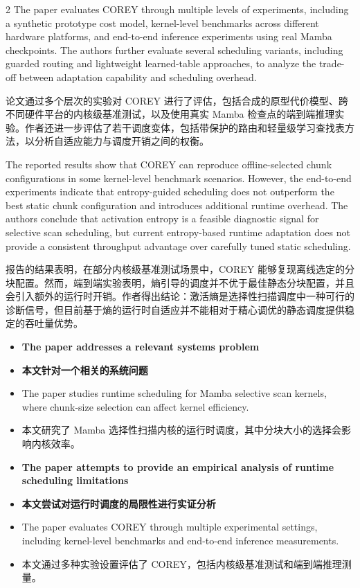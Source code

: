 \documentclass[10pt,a4paper]{article}
\newcommand{\Pair}[2]{#1\par\switchcolumn #2\par\switchcolumn*}
\newcommand{\fieldhead}[1]{{\color{accent}\sffamily\bfseries #1}}
\newcommand{\PairHead}[2]{\Pair{\needspace{5\baselineskip}\fieldhead{#1}}%
                               {\needspace{5\baselineskip}\fieldhead{#2}}}
\newcommand{\PItem}[3]{\Pair{\begin{itemize}[label={#1}]\item #2\end{itemize}}%
                            {\begin{itemize}[label={#1}]\item #3\end{itemize}}}
\newcommand{\PCont}[2]{\Pair{\begin{itemize}[label={}]\item #1\end{itemize}}%
                            {\begin{itemize}[label={}]\item #2\end{itemize}}}
\begin{document}
\begin{paracol}{2}
\Pair{The paper evaluates COREY through multiple levels of experiments, including a
synthetic prototype cost model, kernel-level benchmarks across different hardware
platforms, and end-to-end inference experiments using real Mamba checkpoints. The
authors further evaluate several scheduling variants, including guarded routing and
lightweight learned-table approaches, to analyze the trade-off between adaptation
capability and scheduling overhead.}
{论文通过多个层次的实验对 COREY 进行了评估，包括合成的原型代价模型、跨不同硬件平台的内核级基准测试，以及使用真实 Mamba 检查点的端到端推理实验。作者还进一步评估了若干调度变体，包括带保护的路由和轻量级学习查找表方法，以分析自适应能力与调度开销之间的权衡。}

\Pair{The reported results show that COREY can reproduce offline-selected chunk
configurations in some kernel-level benchmark scenarios. However, the end-to-end
experiments indicate that entropy-guided scheduling does not outperform the best
static chunk configuration and introduces additional runtime overhead. The authors
conclude that activation entropy is a feasible diagnostic signal for selective scan
scheduling, but current entropy-based runtime adaptation does not provide a
consistent throughput advantage over carefully tuned static scheduling.}
{报告的结果表明，在部分内核级基准测试场景中，COREY 能够复现离线选定的分块配置。然而，端到端实验表明，熵引导的调度并不优于最佳静态分块配置，并且会引入额外的运行时开销。作者得出结论：激活熵是选择性扫描调度中一种可行的诊断信号，但目前基于熵的运行时自适应并不能相对于精心调优的静态调度提供稳定的吞吐量优势。}

\PairHead{Strengths}{优点}

\PItem{1.}{\textbf{The paper addresses a relevant systems problem}}
{\textbf{本文针对一个相关的系统问题}}

\PCont{The paper studies runtime scheduling for Mamba selective scan kernels, where
chunk-size selection can affect kernel efficiency.}
{本文研究了 Mamba 选择性扫描内核的运行时调度，其中分块大小的选择会影响内核效率。}

\PItem{2.}{\textbf{The paper attempts to provide an empirical analysis of runtime
scheduling limitations}}
{\textbf{本文尝试对运行时调度的局限性进行实证分析}}

\PCont{The paper evaluates COREY through multiple experimental settings, including
kernel-level benchmarks and end-to-end inference measurements.}
{本文通过多种实验设置评估了 COREY，包括内核级基准测试和端到端推理测量。}

\PairHead{Weaknesses}{不足}


\end{paracol}
\end{document}

